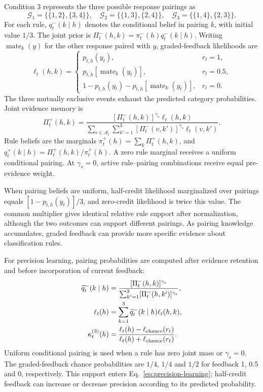Condition 3 represents the three possible response pairings as
\begin{equation}
\mathcal G_1=\{\{1,2\},\{3,4\}\},\quad
\mathcal G_2=\{\{1,3\},\{2,4\}\},\quad
\mathcal G_3=\{\{1,4\},\{2,3\}\}.
\label{eq:response-pairings}
\end{equation}
For each rule, $q_t^-(k\mid h)$ denotes the conditional belief in pairing $k$, with initial value $1/3$. The joint prior is $\Pi_t^-(h,k)=\pi_t^-(h)q_t^-(k\mid h)$. Writing $\operatorname{mate}_k(y)$ for the other response paired with $y$, graded-feedback likelihoods are
\begin{equation}
\ell_t(h,k)=
\begin{cases}
p_{t,h}(y_t),&r_t=1,\\
p_{t,h}[\operatorname{mate}_k(y_t)],&r_t=0.5,\\
1-p_{t,h}(y_t)-p_{t,h}[\operatorname{mate}_k(y_t)],&r_t=0.
\end{cases}
\label{eq:graded-likelihood}
\end{equation}
The three mutually exclusive events exhaust the predicted category probabilities. Joint evidence memory is
\begin{equation}
\Pi_t^+(h,k)=\frac{[\Pi_t^-(h,k)]^{\gamma_s}\ell_t(h,k)}
{\sum_{v\in\mathcal A_t}\sum_{k'=1}^{3}[\Pi_t^-(v,k')]^{\gamma_s}\ell_t(v,k')}.
\label{eq:joint-evidence}
\end{equation}
Rule beliefs are the marginals $\pi_t^+(h)=\sum_k\Pi_t^+(h,k)$, and $q_t^+(k\mid h)=\Pi_t^+(h,k)/\pi_t^+(h)$. A zero rule marginal receives a uniform conditional pairing. At $\gamma_s=0$, active rule--pairing combinations receive equal pre-evidence weight.

When pairing beliefs are uniform, half-credit likelihood marginalized over pairings equals $[1-p_{t,h}(y_t)]/3$, and zero-credit likelihood is twice this value. The common multiplier gives identical relative rule support after normalization, although the two outcomes can support different pairings. As pairing knowledge accumulates, graded feedback can provide more specific evidence about classification rules.

For precision learning, pairing probabilities are computed after evidence retention and before incorporation of current feedback:
\begin{align}
\widetilde q_t^-(k\mid h)&=
\frac{[\Pi_t^-(h,k)]^{\gamma_s}}
{\sum_{k'=1}^{3}[\Pi_t^-(h,k')]^{\gamma_s}},\\
\ell_t(h)&=\sum_{k=1}^{3}\widetilde q_t^-(k\mid h)\ell_t(h,k),\\
\kappa_t^{(3)}(h)&=\frac{\ell_t(h)-\ell_{\rm chance}(r_t)}
{\ell_t(h)+\ell_{\rm chance}(r_t)}.
\label{eq:graded-precision-support}
\end{align}
Uniform conditional pairing is used when a rule has zero joint mass or $\gamma_s=0$. The graded-feedback chance probabilities are $1/4$, $1/4$ and $1/2$ for feedback 1, 0.5 and 0, respectively. This support enters Eq.~\ref{eq:precision-learning}; half-credit feedback can increase or decrease precision according to its predicted probability.

